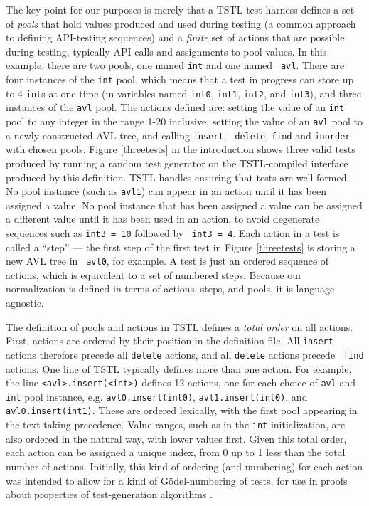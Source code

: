 The key point for our purposes is merely that a TSTL test harness
defines a set of \emph{pools} that hold values produced and used
during testing \cite{AndrewsTR} (a common approach to defining
API-testing sequences) and a \emph{finite} set of actions that are possible during
testing, typically API calls and assignments to pool values.  In this
example, there are two pools, one named {\tt int} and one named {\tt
  avl}.  There are four instances of the {\tt int} pool, which means
that a test in progress can store up to 4 {\tt int}s at one time (in
variables named {\tt int0}, {\tt int1}, {\tt int2}, and {\tt int3}), and three
instances of the {\tt avl} pool.  The actions defined are: setting
the value of an {\tt int} pool to any integer in the range 1-20
inclusive, setting the value of an {\tt avl} pool to a newly
constructed AVL tree, and calling {\tt insert}, {\tt
  delete}, {\tt find} and {\tt inorder} with chosen pools.  Figure
\ref{threetests} in the introduction shows three
valid tests produced by running a random test generator on
the TSTL-compiled interface produced by this definition.  TSTL handles
ensuring that tests are well-formed. No pool instance
(such as {\tt avl1}) can appear in an action until it has been assigned
a value.  No pool instance that has been assigned a value can be
assigned a different value until it has been used in an action, to
avoid degenerate sequences such as {\tt int3 = 10} followed by {\tt
  int3 = 4}.  Each action in a test is called a ``step'' --- the
first step of the first test in Figure \ref{threetests} is storing a new AVL tree in {\tt
  avl0}, for example.  A test is just an ordered sequence of
actions, which is equivalent to a set of numbered steps.  Because our
normalization is defined in terms of actions, steps, and pools, it is
language agnostic.

The definition of pools and actions in TSTL defines a \emph{total
  order} on all actions.  First, actions are ordered by their position
in the definition file.  All {\tt insert} actions therefore precede
all {\tt delete} actions, and all {\tt delete} actions precede {\tt
  find} actions.  One line of TSTL typically defines more than one action. For
example, the line {\tt <avl>.insert(<int>)} defines 12 actions, one
for each choice of {\tt avl} and {\tt int} pool instance, e.g.
{\tt avl0.insert(int0)}, {\tt avl1.insert(int0)}, and {\tt
  avl0.insert(int1)}.  These are
ordered lexically, with the first pool appearing in the text taking
precedence.  Value ranges, such as in the {\tt int} initialization, are also
ordered in the natural way, with lower values first.  Given this total
order, each action can be assigned a unique index, from 0 up to 1 less
than the total number of actions. Initially, this kind of ordering (and
numbering) for each action was intended to allow for a kind of
G\"odel-numbering of tests, for use in proofs about
properties of test-generation algorithms
\cite{AndrewsTR}.

